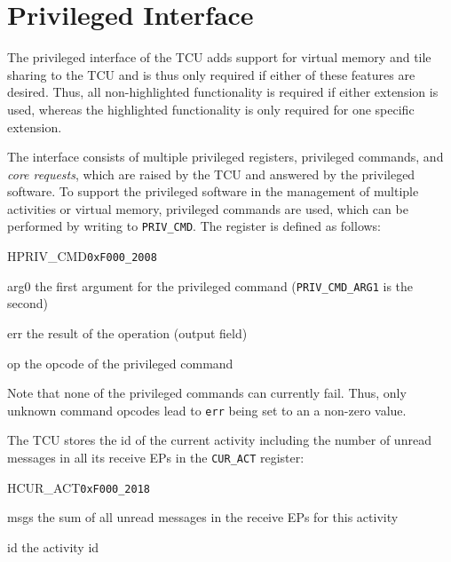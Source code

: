 \chapter{Privileged Interface}

The privileged interface of the TCU adds support for virtual memory and tile sharing to the TCU and is
thus only required if either of these features are desired. Thus, all non-highlighted functionality
is required if either extension is used, whereas the highlighted functionality is only required for
one specific extension.

The interface consists of multiple privileged registers, privileged commands, and \emph{core
requests}, which are raised by the TCU and answered by the privileged software. To support the
privileged software in the management of multiple activities or virtual memory, privileged commands are
used, which can be performed by writing to \texttt{PRIV\_CMD}. The register is defined as follows:

\begin{register}{H}{PRIV\_CMD}{\texttt{0xF000\_2008}}
  \regnewline%
  \begin{regdesc}\begin{reglist}
    \item[arg0] the first argument for the privileged command (\texttt{PRIV\_CMD\_ARG1} is the second)
    \item[err] the result of the operation (output field)
    \item[op] the opcode of the privileged command
  \end{reglist}\end{regdesc}
\end{register}

\noindent Note that none of the privileged commands can currently fail. Thus, only unknown command
opcodes lead to \texttt{err} being set to an a non-zero value.

\noindent The TCU stores the id of the current activity including the number of unread messages in all
its receive EPs in the \texttt{CUR\_ACT} register:

\setlength{\regWidth}{.95\textwidth}
\begin{register}{H}{CUR\_ACT}{\texttt{0xF000\_2018}}
  \regnewline%
  \begin{regdesc}\begin{reglist}
    \item[msgs] the sum of all unread messages in the receive EPs for this activity
    \item[id] the activity id
  \end{reglist}\end{regdesc}
\end{register}
\setlength{\regWidth}{\textwidth}
\extend{}

